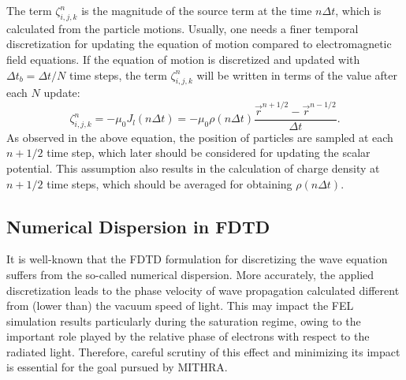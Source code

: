 %
The term $\zeta_{i,j,k}^n$ is the magnitude of the source term at the time $n \Delta t$, which is calculated from the particle motions.
%
Usually, one needs a finer temporal discretization for updating the equation of motion compared to electromagnetic field equations.
%
If the equation of motion is discretized and updated with $\Delta t_b = \Delta t / N$ time steps, the term $\zeta_{i,j,k}^n$ will be written in terms of the value after each $N$ update:
%
\begin{equation}
\label{currentIntegral}
\zeta_{i,j,k}^n = -\mu_0 J_l ( n \Delta t ) = -\mu_0 \rho ( n \Delta t ) \frac{\vec{r}^{n+1/2}-\vec{r}^{n-1/2}}{\Delta t}.
\end{equation}
%
As observed in the above equation, the position of particles are sampled at each $n+1/2$ time step, which later should be considered for updating the scalar potential.
%
This assumption also results in the calculation of charge density at $n+1/2$ time steps, which should be averaged for obtaining $\rho ( n \Delta t )$.

\subsection{Numerical Dispersion in FDTD}

It is well-known that the FDTD formulation for discretizing the wave equation suffers from the so-called numerical dispersion.
%
More accurately, the applied discretization leads to the phase velocity of wave propagation calculated different from (lower than) the vacuum speed of light.
%
This may impact the FEL simulation results particularly during the saturation regime, owing to the important role played by the relative phase of electrons with respect to the radiated light.
%
Therefore, careful scrutiny of this effect and minimizing its impact is essential for the goal pursued by MITHRA.

